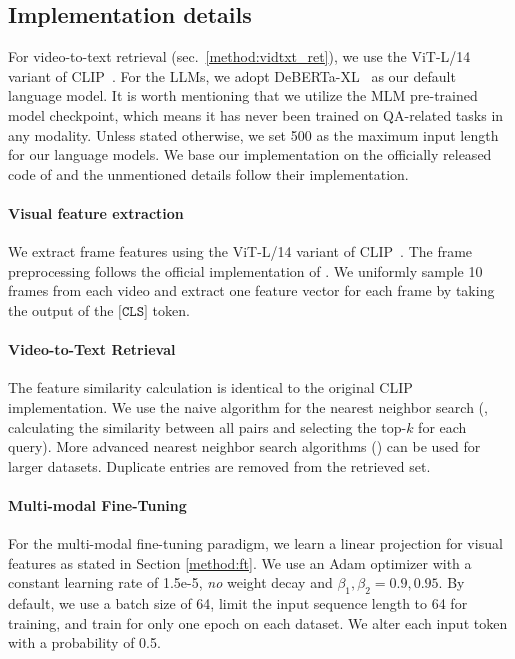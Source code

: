 \subsection{Implementation details}
\label{subsec:implementation}

For video-to-text retrieval (sec.~\ref{method:vidtxt_ret}), we use the ViT-L/14 variant of CLIP~\cite{clip}. For the LLMs, we adopt DeBERTa-XL~\cite{deberta} as our default language model. 
It is worth mentioning that we utilize the MLM pre-trained model checkpoint, which means it has never been trained on QA-related tasks in any modality. Unless stated otherwise, we set 500 as the maximum input length for our language models. We base our implementation on the officially released code of \cite{frozenbilm} and the unmentioned details follow their implementation. 


\vspace{-3mm}

\paragraph{Visual feature extraction} We extract frame features using the ViT-L/14 variant of CLIP~\cite{clip}. The frame preprocessing follows the official implementation of \cite{clip}. We uniformly sample 10 frames from each video and extract one feature vector for each frame by taking the output of the $\texttt{[CLS]}$ token. 


\vspace{-3mm}

\paragraph{Video-to-Text Retrieval} The feature similarity calculation is identical to the original CLIP implementation. We use the naive algorithm for the nearest neighbor search (\ie, calculating the similarity between all pairs and selecting the top-$k$ for each query).  
More advanced nearest neighbor search algorithms (\eg \cite{guo2020accelerating}) can be used for larger datasets.  Duplicate entries are removed from the retrieved set.


\vspace{-3.5mm}

\paragraph{Multi-modal Fine-Tuning} 
For the multi-modal fine-tuning paradigm, we learn a linear projection for visual features as stated in Section \ref{method:ft}. We use an Adam optimizer with a constant learning rate of 1.5e-5, {\it no} weight decay and $\beta_1, \beta_2 = 0.9, 0.95$. By default, we use a batch size of 64, limit the input sequence length to 64 for training, and train for only one epoch on each dataset. We alter each input token with a probability of 0.5. 



